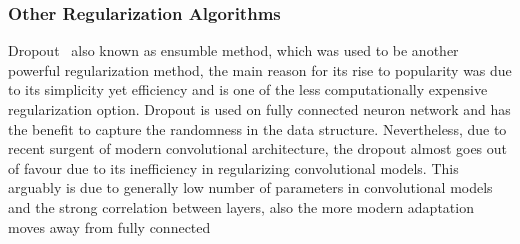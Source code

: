 \subsubsection{Other Regularization Algorithms}

Dropout~\cite{JMLR:v15:srivastava14a} also known as ensumble method, which was used to be another powerful regularization method, the main reason for its rise to popularity was due to its simplicity yet efficiency and is one of the less computationally expensive regularization option. Dropout is used on fully connected neuron network and has the benefit to capture the randomness in the data structure. Nevertheless, due to recent surgent of modern convolutional architecture, the dropout almost goes out of favour due to its inefficiency in regularizing convolutional models. This arguably is due to generally low number of parameters in convolutional models and the strong correlation between layers, also the more modern adaptation moves away from fully connected 